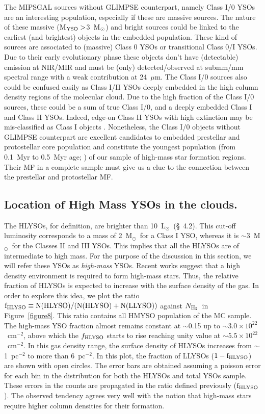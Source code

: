 \documentclass[iop]{emulateapj}
\newcommand{\msun}{M$_{\odot}$}
\newcommand{\lsun}{L$_{\odot}$}
\newcommand{\mipslam}{24~$\mu$m}
\newcommand{\cmsq}{cm$^{-2}$}
\newcommand{\nhtwo}{$N_{{\rm H}_2}$}
\begin{document}
The MIPSGAL sources without GLIMPSE counterpart, namely Class I/0 YSOs are an 
interesting population, especially if these are massive sources. The nature 
of these massive (M$\rm_{YSO}>$3~M$\rm_{\odot}$) and bright sources could be 
linked to the earliest (and brightest) objects in the embedded population. 
These kind of sources are
associated to (massive) Class 0 YSOs \citep{andre+10} or transitional 
Class 0/I YSOs.  Due to their early evolutionary phase these objects
don't have (detectable) emission at NIR/MIR \citep{andre+10}
and must be (only) detected/observed at submm/mm spectral range with a 
weak contribution at \mipslam. The Class I/0 sources also could be 
confused easily as Class I/II YSOs deeply embedded in the high column density 
regions of the molecular cloud. Due to the high fraction of the Class I/0 
sources, these could be a sum of true Class I/0, and a deeply embedded 
Class I and Class II YSOs. 
Indeed, edge-on Class II YSOs with high extinction may be mis-classified 
as Class I objects \citep{robitaille+06,offner+11}.  
Nonetheless, the Class I/0 objects without GLIMPSE 
counterpart are excellent candidates to embedded prestellar and 
protostellar core population and constitute the youngest population 
(from 0.1~Myr to 0.5~Myr age; \citet{enoch+06,andre+10}) of our
sample of high-mass star formation regions. Their MF in a complete 
sample must give us a clue to the connection between the prestellar and 
protostellar MF.


\subsection{Location of High Mass YSOs in the clouds.}


The HLYSOs, for definition, are brighter than 10~\lsun~(\S~4.2). 
This cut-off luminosity corresponds to a mass of 2~\msun\ for a Class I YSO,
whereas it is $\sim$3~\msun\ for the Classes II and III YSOs. This implies
that all the HLYSOs are of intermediate to high mass. For the purpose of 
the discussion in this section, we will refer these YSOs as {\it high-mass} YSOs.
Recent works \citep{krumholz+08,lopezsepulcre+10} suggest that a high density 
environment is required to form high-mass stars.  
Thus, the relative fraction of HLYSOs is expected to increase 
with the surface density of the gas. In order to explore this idea, we
plot the ratio $\rm f_{HLYSO}\equiv N(HLYSO)/(N({HLYSO})+N({LLYSO}))$
against \nhtwo\ in Figure~\ref{figure8}. This ratio contains all HMYSO population 
of the MC sample.
The high-mass YSO fraction almost remains constant at $\sim$0.15 up to 
$\sim3.0\times10^{22}$~\cmsq, above which the $f_{\rm HLYSO}$ starts to rise 
reaching unity value at $\sim5.5\times10^{22}$~\cmsq.
In this gas density range, the surface density of HLYSOs increases from
$\sim$1~pc$^{-2}$ to more than 6~pc$^{-2}$. In this plot, the fraction of LLYSOs 
($\rm 1-f_{HLYSO}$) are shown with open circles.
The error bars are obtained assuming a poisson error for each bin in the 
distribution for both  the HLYSOs and total YSOs sample. These errors in the 
counts are propagated in the ratio defined previously ($\rm f_{HLYSO}$). 
The observed tendency agrees very well with the notion that high-mass stars
require higher column densities for their formation.  
\end{document}
